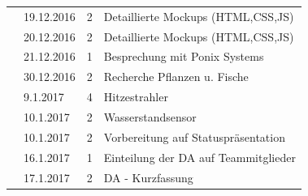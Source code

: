 \documentclass[12pt]{article}
\begin{document}
\begin{table}[hp]
\begin{tabular}{|l|l|c|l|}
\\ \cline{2-4} & 19.12.2016                          & 2                    & Detaillierte Mockups (HTML,CSS,JS)                                                                   
\\ \cline{2-4} & 20.12.2016                          & 2                    & Detaillierte Mockups (HTML,CSS,JS)                                                                      \\ \cline{2-4} 
                                                                                       & 21.12.2016                          & 1                    & Besprechung mit Ponix Systems                                                                           \\ \cline{2-4} 
                                                                                       & 30.12.2016                          & 2                    & Recherche Pflanzen u. Fische                                                                            \\ \cline{2-4} 
                                                                                       & 9.1.2017                            & 4                    & Hitzestrahler                                                                                           \\ \cline{2-4} 
                                                                                       & 10.1.2017                           & 2                    & Wasserstandsensor                                                                                       \\ \cline{2-4} 
                                                                                       & 10.1.2017                           & 2                    & Vorbereitung auf Statuspräsentation                                                                     \\ \cline{2-4} 
                                                                                       & 16.1.2017                           & 1                    & Einteilung der DA auf Teammitglieder                                                                    \\ \cline{2-4} 
                                                                                       & 17.1.2017                           & 2                    & DA - Kurzfassung                                                                                        \\ \cline{2-4} 

\end{tabular}
\end{table}
\end{document}
